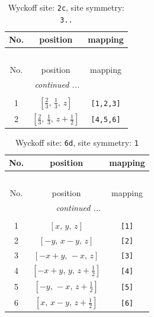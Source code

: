 \documentclass[fleqn,8pt]{jsarticle}
\begin{document}
\begin{longtable}{ccc}
\caption{Wyckoff site: {\tt 2c}, site symmetry: {\tt 3..}}
 \\
 \hline \hline
No. & position & mapping \\ \hline \endfirsthead

\multicolumn{2}{l}{\tablename\ \thetable{}} \\
 \hline \hline
No. & position & mapping \\ \hline \endhead

 \hline \hline
\multicolumn{2}{r}{\footnotesize\it continued ...} \\ \endfoot

 \hline \hline
\multicolumn{2}{r}{} \\ \endlastfoot

1 & $\left[ \frac{2}{3},\, \frac{1}{3},\, z \right]$ & {\tt [1,2,3]} \\ \hline
2 & $\left[ \frac{2}{3},\, \frac{1}{3},\, z + \frac{1}{2} \right]$ & {\tt [4,5,6]} \\
\end{longtable}
\renewcommand{\arraystretch}{1.2}
\begin{longtable}{ccc}
\caption{Wyckoff site: {\tt 6d}, site symmetry: {\tt 1}}
 \\
 \hline \hline
No. & position & mapping \\ \hline \endfirsthead

\multicolumn{2}{l}{\tablename\ \thetable{}} \\
 \hline \hline
No. & position & mapping \\ \hline \endhead

 \hline \hline
\multicolumn{2}{r}{\footnotesize\it continued ...} \\ \endfoot

 \hline \hline
\multicolumn{2}{r}{} \\ \endlastfoot

1 & $\left[ x,\, y,\, z \right]$ & {\tt [1]} \\ \hline
2 & $\left[ - y,\, x - y,\, z \right]$ & {\tt [2]} \\ \hline
3 & $\left[ - x + y,\, - x,\, z \right]$ & {\tt [3]} \\ \hline
4 & $\left[ - x + y,\, y,\, z + \frac{1}{2} \right]$ & {\tt [4]} \\ \hline
5 & $\left[ - y,\, - x,\, z + \frac{1}{2} \right]$ & {\tt [5]} \\ \hline
6 & $\left[ x,\, x - y,\, z + \frac{1}{2} \right]$ & {\tt [6]} \\
\end{longtable}
\end{document}
